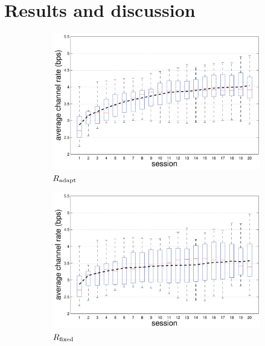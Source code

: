 \documentclass{sigchi}
\begin{document}
\section{Results and discussion}
\label{sec-results}
 
\begin{figure}[!t]
  \centering
  \begin{subfigure}[b]{\columnwidth}
    \includegraphics[width=\columnwidth]{figures/IUI_BPS_p_adapt.pdf}
    \caption{$R_{\mathrm{adapt}}$}
    \label{fig:channel_rate_adapt}
  \end{subfigure}
  \begin{subfigure}[b]{\columnwidth}
    \includegraphics[width=\columnwidth]{figures/IUI_BPS_p_first.pdf}
    \caption{$R_{\mathrm{fixed}}$}
    \label{fig:channel_rate_fixed}
  \end{subfigure}
  \begin{subfigure}[b]{\columnwidth}

\end{subfigure}
\end{figure}
\end{document}
